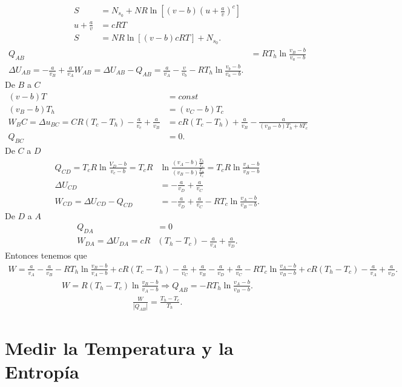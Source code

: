 \documentclass{report}
\begin{document}
\begin{align*}
  S &= N_{s_0} + N R \ln\left[ \left( v-b \right) \left( u+\frac{a}{v} \right) ^c \right] \\
  u + \frac{a}{v} &= cRT\\
  S &= NR\ln\left[ (v-b)cRT \right] + N_{s_0}
.\end{align*}
\begin{align*}
  Q_{AB} &= RT_h\ln\frac{v_B-b}{v_a -b}\\
  \Delta U_{AB} = -\frac{a}{v_B}+\frac{a}{v_A}
  W_{AB} = \Delta U_{AB}-Q_{AB}=\frac{a}{v_A}-\frac{v}{v_b}-RT_h\ln\frac{v_b-b}{v_a-b}
.\end{align*}
De $B$ a $C$
 \begin{align*}
   (v-b)T&=const\\
   (v_B-b)T_h&= (v_C-b)T_c \\
   W_BC = \Delta u_{BC} = CR(T_c-T_h) - \frac{a}{v_c}+\frac{a}{v_B}&= cR(T_c-T_h)+\frac{a}{v_B}-\frac{a}{(v_B-b)T_h+bT_c} \\
   Q_{BC}&=0
.\end{align*}
De $C$ a $D$
\begin{align*}
  Q_{CD} = T_cR\ln\frac{V_D-b}{v_c-b}=T_cR&\ln\frac{(v_A-b)\frac{T_h}{T_c}}{(v_B-b)\frac{T_n}{T_c}}=T_cR\ln\frac{v_A-b}{v_B-b}\\
  \Delta U_{CD} &= -\frac{a}{v_D}+\frac{a}{v_C}\\
  W_{CD}=\Delta U_{CD}-Q_{CD} &= -\frac{a}{v_D}+\frac{a}{v_C}-RT_c\ln\frac{v_A-b}{v_B-b}
.\end{align*}
De $D$ a $A$
\begin{align*}
  Q_{DA} &= 0 \\
  W_{DA} =\Delta U_{DA} = cR&\left( T_h-T_c \right) -\frac{a}{v_A}+\frac{a}{v_D}
.\end{align*}
Entonces tenemos que
\begin{align*}
  W=\frac{a}{v_A}-\frac{a}{v_B}-RT_h\ln\frac{v_B-b}{v_A-b}+cR(T_c-T_h)-\frac{a}{v_C}+\frac{a}{v_B}-\frac{a}{v_D}+\frac{a}{v_C}-RT_c\ln\frac{v_A-b}{v_B-b}+cR(T_h-T_c)-\frac{a}{v_A}+\frac{a}{v_D}
.\end{align*}
\begin{align*}
  W = R(T_h-T_c)\ln\frac{v_B-b}{v_A-b}\Rightarrow Q_{AB}=-RT_h\ln\frac{v_A-b}{v_B-b}
.\end{align*}
\begin{align*}
  \frac{W}{|Q_{AB}|}=\frac{T_h-T_c}{T_h}
.\end{align*}
\section{Medir la Temperatura y la Entropía}
\end{document}
